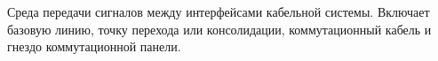 Среда передачи сигналов между интерфейсами кабельной системы.
Включает базовую линию, точку перехода или консолидации, 
коммутационный кабель и гнездо коммутационной панели.
